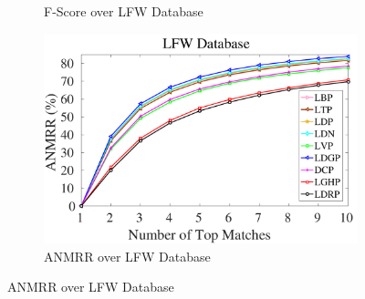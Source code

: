 \documentclass[a4paper]{article}
\begin{document}
\begin{figure}[!t]
\begin{subfigure}{.25\textwidth}
    \caption{F-Score over LFW Database}
    \label{fig:lfw-f}
  \end{subfigure}%
    \begin{subfigure}{.25\textwidth}
    \centering
    \includegraphics[width=.98\linewidth]{lfw-anmrr}
    \caption{ANMRR over LFW Database}
    \label{fig:lfw-anmrr}
  \end{subfigure}
  \vspace{3mm}
  

\end{figure}
\end{document}
